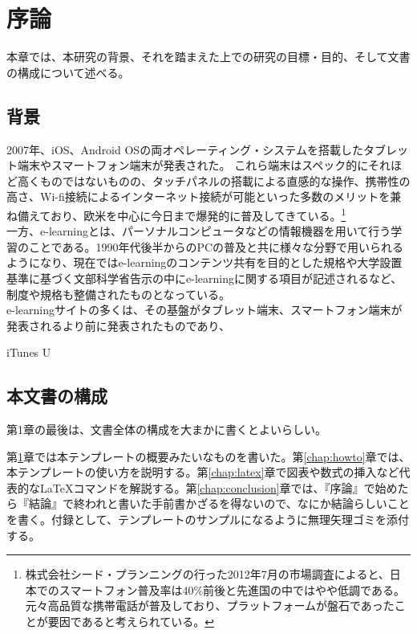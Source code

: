 \chapter{序論}
\label{chap:introduction}

本章では、本研究の背景、それを踏まえた上での研究の目標・目的、そして文書の構成について述べる。

\section{背景}

2007年、iOS、Android OSの両オペレーティング・システムを搭載したタブレット端末やスマートフォン端末が発表された。
これら端末はスペック的にそれほど高くものではないものの、タッチパネルの搭載による直感的な操作、携帯性の高さ、Wi-fi接続によるインターネット接続が可能といった多数のメリットを兼ね備えており、欧米を中心に今日まで爆発的に普及してきている。\footnote{株式会社シード・プランニングの行った2012年7月の市場調査\cite{smartphoneresearch}によると、日本でのスマートフォン普及率は40\%前後と先進国の中ではやや低調である。元々高品質な携帯電話が普及しており、プラットフォームが盤石であったことが要因であると考えられている。}\\
一方、e-learningとは、パーソナルコンピュータなどの情報機器を用いて行う学習のことである。1990年代後半からのPCの普及と共に様々な分野で用いられるようになり、現在ではe-learningのコンテンツ共有を目的とした規格\cite{scorm}や大学設置基準に基づく文部科学省告示の中にe-learningに関する項目が記述される\cite{monkasho}など、制度や規格も整備されたものとなっている。\\
e-learningサイトの多くは、その基盤がタブレット端末、スマートフォン端末が発表されるより前に発表されたものであり、

iTunes U


\section{本文書の構成}

第1章の最後は、文書全体の構成を大まかに書くとよいらしい。

第\ref{chap:introduction}章では本テンプレートの概要みたいなものを書いた。第\ref{chap:howto}章では、本テンプレートの使い方を説明する。第\ref{chap:latex}章で図表や数式の挿入など代表的な\LaTeX コマンドを解説する。第\ref{chap:conclusion}章では、『序論』で始めたら『結論』で終われと書いた手前書かざるを得ないので、なにか結論らしいことを書く。付録として、テンプレートのサンプルになるように無理矢理ゴミを添付する。